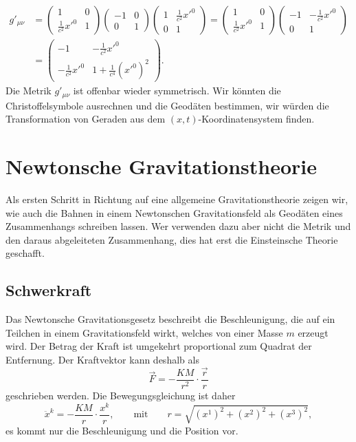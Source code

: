 \begin{align*}
g'_{\mu\nu}
&=
\begin{pmatrix}
1&0\\
\frac1{c^2}x'^0&1
\end{pmatrix}
\begin{pmatrix}
-1&0\\0&1
\end{pmatrix}
\begin{pmatrix}
1&\frac1{c^2}x'^0\\
0&1
\end{pmatrix}
=
\begin{pmatrix}
1&0\\
\frac1{c^2}x'^0&1
\end{pmatrix}
\begin{pmatrix}
-1&-\frac1{c^2}x'^0\\
 0& 1
\end{pmatrix}
\\
&=
\begin{pmatrix}
-1&-\frac1{c^2}x'^0\\
-\frac1{c^2}x'^0&1+\frac1{c^4}(x'^0)^2
\end{pmatrix}.
\end{align*}
Die Metrik $g'_{\mu\nu}$ ist offenbar wieder symmetrisch.
Wir könnten die Christoffelsymbole ausrechnen und die Geodäten
bestimmen, wir würden die Transformation von Geraden aus dem
$(x,t)$-Koordinatensystem finden.

\section{Newtonsche Gravitationstheorie%
\label{skript:section:newtonschegravitationstheorie}}
Als ersten Schritt in Richtung auf eine allgemeine Gravitationstheorie
zeigen wir, wie auch die Bahnen in einem Newtonschen Gravitationsfeld 
als Geodäten eines Zusammenhangs schreiben lassen.
Wer verwenden dazu aber nicht die Metrik und den daraus abgeleiteten 
Zusammenhang, dies hat erst die Einsteinsche Theorie geschafft.

\subsection{Schwerkraft}
Das Newtonsche Gravitationsgesetz beschreibt die Beschleunigung, die
auf ein Teilchen in einem Gravitationsfeld wirkt, welches von einer
Masse $m$ erzeugt wird.
Der Betrag der Kraft ist umgekehrt proportional zum Quadrat der
Entfernung.
Der Kraftvektor kann deshalb als
\begin{equation}
\vec F = -\frac{KM}{r^2}\cdot\frac{\vec r}{r}
\label{skript:gravitation:gkraft}
\end{equation}
geschrieben werden.
Die Bewegungsgleichung ist daher 
\begin{equation}
\ddot x^k = -\frac{KM}{r}\cdot\frac{x^k}{r},
\qquad\text{mit}\qquad r = \sqrt{(x^1)^2+(x^2)^2+(x^3)^2},
\label{skript:gravitation:bewegungsgleichung}
\end{equation}
es kommt nur die Beschleunigung und die Position vor.

